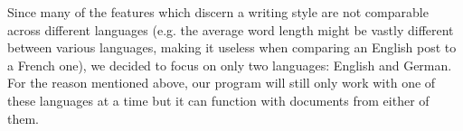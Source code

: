 Since many of the features which discern a writing style are not comparable across different languages (e.g. the average word length might be vastly different between various languages, making it useless when comparing an English post to a French one), we decided to focus on only two languages: English and German.
For the reason mentioned above, our program will still only work with one of these languages at a time but it can function with documents from either of them.